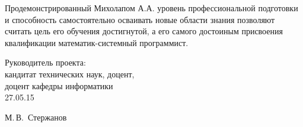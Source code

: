 \begin{singlespace}
{Продемонстрированный Михолапом А.А. уровень профессиональной подготовки и способность самостоятельно осваивать новые области знания позволяют считать цель его обучения достигнутой, а его самого достоиным присвоения квалификации математик-системный программист.

  \vfill
  \noindent
  \begin{minipage}{0.54\textwidth}
    \begin{flushleft}
      Руководитель проекта:\\
      кандитат технических наук, доцент,\\
      доцент кафедры информатики\\[0.2em]
      27.05.15
    \end{flushleft}
  \end{minipage}
  \begin{minipage}{0.44\textwidth}
    \begin{flushright}
      \underline{\hspace*{3cm}} М.\,В.~Стержанов
    \end{flushright}
  \end{minipage}
}

\end{singlespace}

\clearpage
